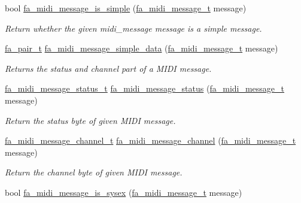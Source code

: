 \begin{DoxyCompactItemize}
bool \hyperlink{group___fa_midi_message_ga21acffcd72a6a1ca793927d7533623fc}{fa\-\_\-midi\-\_\-message\-\_\-is\-\_\-simple} (\hyperlink{group___fa_midi_message_gaa73293eb40a2cffdc2294e3cb6dc2564}{fa\-\_\-midi\-\_\-message\-\_\-t} message)
\begin{DoxyCompactList}\small\item\em Return whether the given midi\-\_\-message message is a simple message. \end{DoxyCompactList}\item 
\hyperlink{group___fa_pair_gac2b2e58c230bac4f8a63ef6c05072680}{fa\-\_\-pair\-\_\-t} \hyperlink{group___fa_midi_message_gabc4f2eca0eba71269aadf05a9af534b1}{fa\-\_\-midi\-\_\-message\-\_\-simple\-\_\-data} (\hyperlink{group___fa_midi_message_gaa73293eb40a2cffdc2294e3cb6dc2564}{fa\-\_\-midi\-\_\-message\-\_\-t} message)
\begin{DoxyCompactList}\small\item\em Returns the status and channel part of a M\-I\-D\-I message. \end{DoxyCompactList}\item 
\hyperlink{group___fa_midi_message_gaf34878eefb2ec676b7894176528d5b05}{fa\-\_\-midi\-\_\-message\-\_\-status\-\_\-t} \hyperlink{group___fa_midi_message_gae7ca84ade26ff713f30555c2dd7dfc45}{fa\-\_\-midi\-\_\-message\-\_\-status} (\hyperlink{group___fa_midi_message_gaa73293eb40a2cffdc2294e3cb6dc2564}{fa\-\_\-midi\-\_\-message\-\_\-t} message)
\begin{DoxyCompactList}\small\item\em Return the status byte of given M\-I\-D\-I message. \end{DoxyCompactList}\item 
\hyperlink{group___fa_midi_message_gae7fc48e105b9bec5500bc422231a1159}{fa\-\_\-midi\-\_\-message\-\_\-channel\-\_\-t} \hyperlink{group___fa_midi_message_gab9d0873ebfcb0b112e1fb63db84d389c}{fa\-\_\-midi\-\_\-message\-\_\-channel} (\hyperlink{group___fa_midi_message_gaa73293eb40a2cffdc2294e3cb6dc2564}{fa\-\_\-midi\-\_\-message\-\_\-t} message)
\begin{DoxyCompactList}\small\item\em Return the channel byte of given M\-I\-D\-I message. \end{DoxyCompactList}\item 
bool \hyperlink{group___fa_midi_message_ga623772138041edb8566be99ebbae91f3}{fa\-\_\-midi\-\_\-message\-\_\-is\-\_\-sysex} (\hyperlink{group___fa_midi_message_gaa73293eb40a2cffdc2294e3cb6dc2564}{fa\-\_\-midi\-\_\-message\-\_\-t} message)

\end{DoxyCompactItemize}
